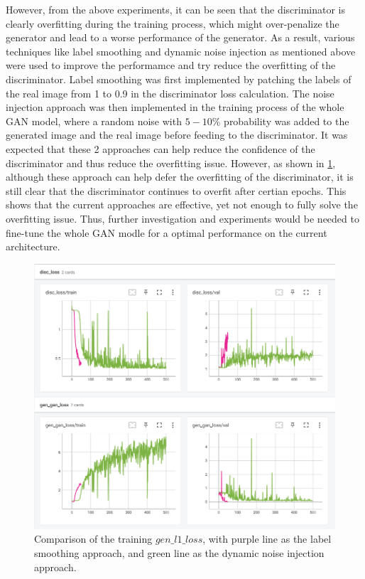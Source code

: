 \documentclass[10pt,twocolumn,letterpaper]{article}
\begin{document}
However, from the above experiments, it can be seen that the discriminator is clearly overfitting during the training process, which might over-penalize the generator and lead to a worse performance of the 
generator. As a result, various techniques like label smoothing and dynamic noise injection as mentioned above were used to improve the performamce and try reduce the overfitting of the discriminator. 
Label smoothing was first implemented by patching the labels of the real image from 1 to 0.9 in the discriminator loss calculation. The noise injection approach was then implemented in the training process of the 
whole GAN model, where a random noise with $5-10\%$ probability was added to the generated image and the real image before feeding to the discriminator. It was expected that these 2 approaches can help reduce the 
confidence of the discriminator and thus reduce the overfitting issue. However, as shown in \cref{fig:smooth_with_noise}, although these approach can help defer the overfitting of the discriminator, it is still 
clear that the discriminator continues to overfit after certian epochs. This shows that the current approaches are effective, yet not enough to fully solve the overfitting issue. Thus, further investigation and 
experiments would be needed to fine-tune the whole GAN modle for a optimal performance on the current architecture.

\begin{figure}[t]
    \centering
    \includegraphics[width=\linewidth]{figures/milestone/smooth_with_noise.png}
    \caption{Comparison of the training $gen\_l1\_loss$, with purple line as the label smoothing approach, and green line as the dynamic noise injection approach.}
    \label{fig:smooth_with_noise}
\end{figure}
\end{document}
